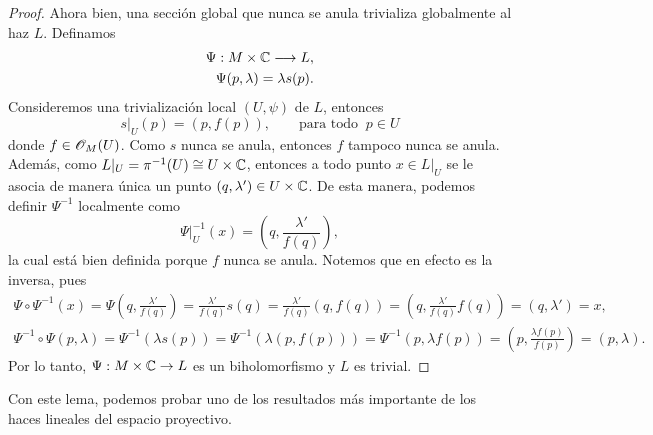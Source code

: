 \begin{proof}
		Ahora bien, una sección global que nunca se anula trivializa globalmente al haz $L$. Definamos
		\begin{align*}
			\Psi:M\times \mathbb{C}\longrightarrow L,\\
			\Psi(p,\lambda)=\lambda s(p).
		\end{align*}
		Consideremos una trivialización local $(U,\psi)$ de $L$, entonces
		\begin{equation*}
			s|_U(p)=(p,f(p)),\qquad \text{para todo }\ p\in U
		\end{equation*}
		donde $f\in\mathscr{O}_M(U)$. Como $s$ nunca se anula, entonces $f$ tampoco nunca se anula. Además, como $L|_U=\pi^{-1}(U)\cong U\times \mathbb{C}$, entonces a todo punto $x\in L|_U$ se le asocia de manera única un punto $(q,\lambda')\in U\times \mathbb{C}$. De esta manera, podemos definir $\Psi^{-1}$ localmente como
		\begin{equation*}
			\Psi|_U^{-1}(x)=\left(q,\frac{\lambda'}{f(q)}\right),
		\end{equation*}
		la cual está bien definida porque $f$ nunca se anula.
		Notemos que en efecto es la inversa, pues
		\begin{align*}
			\Psi\circ\Psi^{-1}(x)=\Psi\left(q,\frac{\lambda'}{f(q)}\right)=\frac{\lambda'}{f(q)}s(q)=\frac{\lambda'}{f(q)}(q,f(q))=\left(q,\frac{\lambda'}{f(q)}f(q)\right)=(q,\lambda')=x,\\
			\Psi^{-1}\circ\Psi(p,\lambda)=\Psi^{-1}(\lambda s(p))=\Psi^{-1}(\lambda(p,f(p)))=\Psi^{-1}(p,\lambda f(p))=\left(p,\frac{\lambda f(p)}{f(p)}\right)=(p,\lambda).
		\end{align*}
		Por lo tanto, $\Psi:M\times \mathbb{C}\to L$ es un biholomorfismo y $L$ es trivial.
	\end{proof}
	
	Con este lema, podemos probar uno de los resultados más importante de los haces lineales del espacio proyectivo.
	
